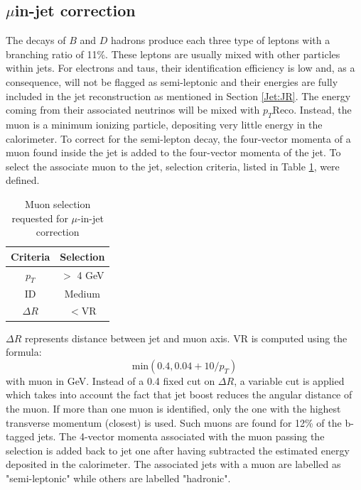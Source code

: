 \subsection{\texorpdfstring{$\mu$}-in-jet correction}
\label{Jet:Cal:BCal:MuInJet}
The decays of $B$ and $D$ hadrons produce each three type of leptons with a branching ratio of 11\%. These leptons are usually mixed with other particles within jets. For electrons and taus, their identification efficiency is low and, as a consequence, will not be flagged as semi-leptonic and their energies are fully included in the jet reconstruction as mentioned in Section \ref{Jet:JR}. The energy coming from their associated neutrinos will be mixed with $p_T$Reco. Instead, the muon is a minimum ionizing particle, depositing very little energy in the calorimeter. To correct for the semi-lepton decay, the four-vector momenta of a muon found inside the jet is added to the four-vector momenta of the jet. To select the associate muon to the jet, selection criteria, listed in Table \ref{tab:Jet:Cal:BCal:MuInJet:Sel}, were defined.
\begin{table}[htbp]
    \centering
    \begin{tabular}{cc}
       \hline\hline
        Criteria & Selection \\
        \hline
        $p_T$ & $>$ 4 GeV \\
         ID & Medium \\
         $\Delta R$ &  $<$VR\\
         \hline
         \hline
    \end{tabular}
    \caption{Muon selection requested for $\mu$-in-jet correction}
    \label{tab:Jet:Cal:BCal:MuInJet:Sel}
\end{table}
$\Delta R$ represents distance between jet and muon axis. VR is computed using the formula:
\begin{equation}
    \mathrm{min}(0.4, 0.04+10/p_T)
\end{equation}
with muon \pT in GeV. Instead of a 0.4 fixed cut on $\Delta R$, a variable cut is applied which takes into account the fact that jet boost reduces the angular distance of the muon. If more than one muon is identified, only the one with the highest transverse momentum (closest) is used. Such muons are found for 12\% of the b-tagged jets. The 4-vector momenta associated with the muon passing the selection is added back to jet one after having subtracted the estimated energy deposited in the calorimeter. The associated jets with a muon are labelled as "semi-leptonic" while others are labelled "hadronic".

